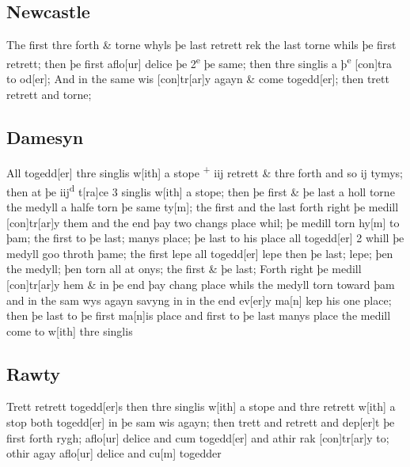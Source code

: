 \documentclass[12pt,letter]{article} %
\newcommand{\srcpg}[1]{
    \noindent{
        \color{Gray}{\rule[0.5ex]{\linewidth}{1pt}~#1} 
        \\
    }
}
\begin{document}
\subsection{Newcastle}
The first thre forth \& torne whyls þe last retrett rek the last torne
whils þe first retrett; then þe first aflo{[}ur{]} delice þe
2\textsuperscript{e} þe same; then thre singlis a þ\textsuperscript{e}
{[}con{]}tra to od{[}er{]}; \srcpg{68} And in the same wis
{[}con{]}tr{[}ar{]}y agayn \& come togedd{[}er{]}; then trett retrett
and torne;

\subsection{Damesyn}
All togedd{[}er{]} thre singlis w{[}ith{]} a stope \textsuperscript{+}
iij retrett \& thre forth and so ij tymys; then at þe
\reversemarginpar{}iij\textsuperscript{d} t{[}ra{]}ce 3 singlis w{[}ith{]} a stope; then þe
first \& þe last a holl torne the medyll a halfe torn þe same ty{[}m{]};
the first and the last forth right þe medill {[}con{]}tr{[}ar{]}y them
and the end þay two changs place whil; þe medill torn hy{[}m{]} to þam;
the first to þe last; manys place; þe last to his place all
togedd{[}er{]} 2 whill þe medyll goo throth þame; the first lepe all
togedd{[}er{]} lepe then þe last; lepe; þen the medyll; þen torn all at
onys; the first \& þe last; \srcpg{69} Forth right þe medill
{[}con{]}tr{[}ar{]}y hem \& in þe end þay chang place whils the medyll
torn toward þam and in the sam wys agayn savyng in in the end
ev{[}er{]}y ma{[}n{]} kep his one place; then þe last to þe first
ma{[}n{]}is place and first to þe last manys place the medill come to
w{[}ith{]} thre singlis

\subsection{Rawty}
Trett retrett togedd{[}er{]}s then thre singlis w{[}ith{]} a stope and
thre retrett w{[}ith{]} a stop both togedd{[}er{]} in þe sam wis agayn;
then trett and retrett and dep{[}er{]}t þe first forth rygh;
aflo{[}ur{]} delice and cum togedd{[}er{]} and athir rak
{[}con{]}tr{[}ar{]}y to; othir agay aflo{[}ur{]} delice and cu{[}m{]}
togedder
\end{document}
